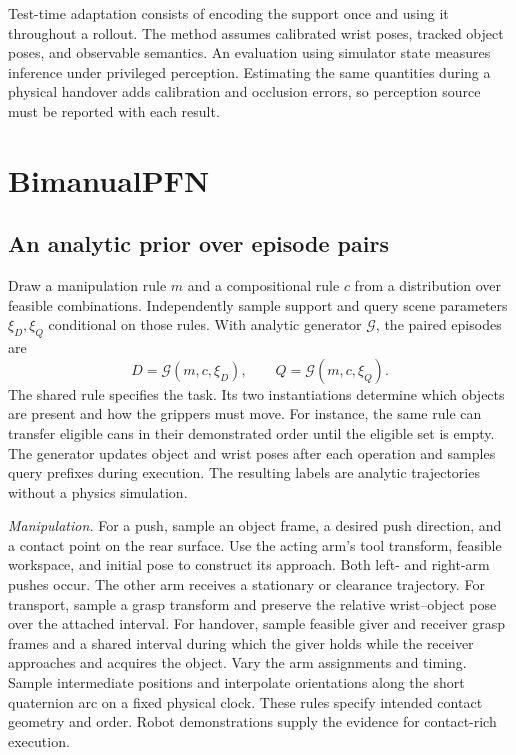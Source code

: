 \documentclass[letterpaper,10pt,conference]{ieeeconf}
\begin{document}
Test-time adaptation consists of encoding the support once and using it throughout a rollout. The method assumes calibrated wrist poses, tracked object poses, and observable semantics. An evaluation using simulator state measures inference under privileged perception. Estimating the same quantities during a physical handover adds calibration and occlusion errors, so perception source must be reported with each result.

\section{BimanualPFN}
\subsection{An analytic prior over episode pairs}
Draw a manipulation rule $m$ and a compositional rule $c$ from a distribution over feasible combinations. Independently sample support and query scene parameters $\xi_D,\xi_Q$ conditional on those rules. With analytic generator $\mathcal G$, the paired episodes are
\begin{equation}
D=\mathcal G(m,c,\xi_D),\qquad Q=\mathcal G(m,c,\xi_Q).
\end{equation}
The shared rule specifies the task. Its two instantiations determine which objects are present and how the grippers must move. For instance, the same rule can transfer eligible cans in their demonstrated order until the eligible set is empty. The generator updates object and wrist poses after each operation and samples query prefixes during execution. The resulting labels are analytic trajectories without a physics simulation.

\textit{Manipulation.}
For a push, sample an object frame, a desired push direction, and a contact point on the rear surface. Use the acting arm's tool transform, feasible workspace, and initial pose to construct its approach. Both left- and right-arm pushes occur. The other arm receives a stationary or clearance trajectory. For transport, sample a grasp transform and preserve the relative wrist--object pose over the attached interval. For handover, sample feasible giver and receiver grasp frames and a shared interval during which the giver holds while the receiver approaches and acquires the object. Vary the arm assignments and timing. Sample intermediate positions and interpolate orientations along the short quaternion arc on a fixed physical clock. These rules specify intended contact geometry and order. Robot demonstrations supply the evidence for contact-rich execution.
\end{document}
